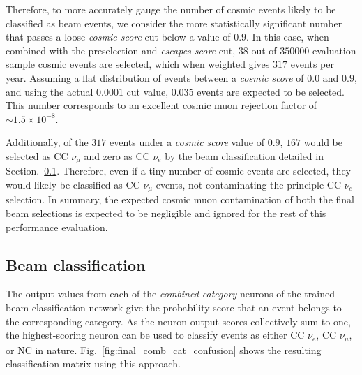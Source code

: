 Therefore, to more accurately gauge the number of cosmic events likely to be classified as beam
events, we consider the more statistically significant number that passes a loose \emph{cosmic
score} cut below a value of $0.9$. In this case, when combined with the preselection and
\emph{escapes score} cut, $38$ out of $350000$ evaluation sample cosmic events are selected, which
when weighted gives $317$ events per year. Assuming a flat distribution of events between a
\emph{cosmic score} of $0.0$ and $0.9$, and using the actual $0.0001$ cut value, $0.035$ events
are expected to be selected. This number corresponds to an excellent cosmic muon rejection factor
of $\sim1.5\times10^{-8}$.

Additionally, of the $317$ events under a \emph{cosmic score} value of $0.9$, $167$ would be
selected as CC $\nu_{\mu}$ and zero as CC $\nu_{e}$ by the beam classification detailed in
Section.~\ref{sec:results_eval_beam}. Therefore, even if a tiny number of cosmic events are
selected, they would likely be classified as CC $\nu_{\mu}$ events, not contaminating the
principle CC $\nu_{e}$ selection. In summary, the expected cosmic muon contamination of both the
final beam selections is expected to be negligible and ignored for the rest of this performance
evaluation.

\subsection{Beam classification} %
\label{sec:results_eval_beam} %

The output values from each of the \emph{combined category} neurons of the trained beam
classification network give the probability score that an event belongs to the corresponding
category. As the neuron output scores collectively sum to one, the highest-scoring neuron can be
used to classify events as either CC $\nu_{e}$, CC $\nu_{\mu}$, or NC in nature.
Fig.~\ref{fig:final_comb_cat_confusion} shows the resulting classification matrix using this
approach.

